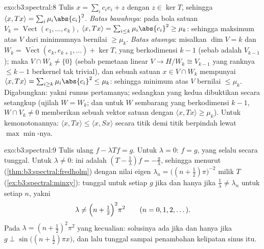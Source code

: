 \begin{solution}{exo:b3:spectral:8}
Tulis $x = \sum_ic_ie_i + z$ dengan $z \in \ker T$, sehingga $\langle x,
Tx\rangle = \sum_i\mu_i\abs{c_i}^2$. \emph{Batas bawahnya}: pada
bola satuan $V_k = \operatorname{Vect}(e_1, \dots,
e_k)$, $\langle x, Tx\rangle = \sum_{i\leq
k}\mu_i\abs{c_i}^2 \geq \mu_k$: sehingga maksimum atas $V$ dari minimumnya
bernilai $\geq \mu_k$. \emph{Batas atasnya}: misalkan $\dim V = k$ dan $W_k
= \overline{\operatorname{Vect}}(e_k, e_{k+1}, \dots) +
\ker T$, yang berkodimensi $k - 1$ (sebab  adalah
$V_{k-1}$); maka $V \cap W_k \neq \{0\}$ (sebab pemetaan linear $V \to
H/W_k \cong V_{k-1}$ yang ranknya $\leq k - 1$ berkernel
tak trivial), dan sebuah satuan $x \in V\cap W_k$ mempunyai $\langle x,
Tx\rangle = \sum_{i \geq k}\mu_i\abs{c_i}^2 \leq \mu_k$: sehingga
minimum atas $V$ bernilai $\leq \mu_k$. Digabungkan: yakni rumus pertamanya;
sedangkan yang kedua dibuktikan secara setangkup (ujilah $W = W_k$; dan untuk
$W$ sembarang yang berkodimensi $k-1$, $W \cap V_k \neq 0$ memberikan
sebuah vektor satuan dengan $\langle x, Tx\rangle \geq \mu_k$).
Untuk kemonotonannya: $\langle x, Tx\rangle \leq \langle x,
Sx\rangle$ secara titik demi titik berpindah lewat $\max\min$-nya.
\end{solution}

\begin{solution}{exo:b3:spectral:9}
Tulis ulang $f - \lambda Tf = g$. Untuk $\lambda = 0$: $f = g$,
yang selalu  secara tunggal. Untuk $\lambda \neq 0$: ini adalah
$(T - \frac1\lambda)f = -\frac g\lambda$, sehingga menurut  (\cref{thm:b3:spectral:fredholm}) dengan
nilai eigen $\lambda_n = \bigl((n + \frac12)\pi\bigr)^{-2}$ milik
$T$ (\cref{ex:b3:spectral:minxy}):  tunggal untuk setiap
$g$ jika dan hanya jika $\frac1\lambda \neq \lambda_n$ untuk setiap $n$, yakni
\[
\lambda \neq \Bigl(n + \tfrac12\Bigr)^2\pi^2
\qquad (n = 0, 1, 2, \dots).
\]
Pada $\lambda = (n+\frac12)^2\pi^2$ yang kecualian: solusinya
ada jika dan hanya jika $g \perp \sin\bigl((n{+}\frac12)\pi x\bigr)$, dan
lalu tunggal sampai penambahan kelipatan sinus itu.
\end{solution}

